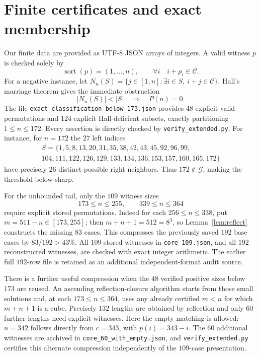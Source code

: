 \documentclass[10pt]{article}
\newcommand{\good}{\mathcal{G}}
\newcommand{\cubes}{\mathcal{C}}
\begin{document}
\section{Finite certificates and exact membership}
Our finite data are provided as UTF-8 JSON arrays of integers.
A valid witness $p$ is checked solely by
\[
\operatorname{sort}(p)=(1,\dots,n),\qquad
\forall i\quad i+p_i\in\cubes.
\]
For a negative instance, let
$N_n(S)=\{j\in[1,n]:\exists i\in S,\ i+j\in\cubes\}$.
Hall's marriage theorem gives the immediate obstruction
\begin{equation}\label{eq:hall}
|N_n(S)|<|S|\quad\Longrightarrow\quad P(n)=0.
\end{equation}
The file \texttt{exact\_classification\_below\_173.json}
provides $48$ explicit valid permutations and $124$
explicit Hall-deficient subsets, exactly partitioning
$1\le n\le172$. Every assertion is directly checked
by \texttt{verify\_extended.py}. For instance, for $n=172$
the $27$ left indices
\[
\begin{gathered}
S=\{1,5,8,13,20,31,35,38,42,43,45,92,96,99,\\
104,111,122,126,129,133,134,136,153,157,160,165,172\}
\end{gathered}
\]
have precisely $26$ distinct possible right neighbors.
Thus $172\notin\good$, making the threshold below sharp.

For the unbounded tail, only the $109$ witness sizes
\begin{equation}\label{eq:core}
173\le n\le255,\qquad 339\le n\le364
\end{equation}
require explicit stored permutations.
Indeed for each $256\le n\le338$, put
$m=511-n\in[173,255]$; then
$m+n+1=512=8^3$, so Lemma~\ref{lem:reflect}
constructs the missing $83$ cases.
This compresses the previously saved $192$ base cases
by $83/192>43\%$. All $109$ stored witnesses in
\texttt{core\_109.json}, and all $192$ reconstructed
witnesses, are checked with exact integer arithmetic.
The earlier full $192$-row file is retained as an
additional independent-format audit source.

There is a further useful compression when the $48$
verified positive sizes below $173$ are reused.
An ascending reflection-closure algorithm starts from
those small solutions and, at each $173\le n\le364$,
uses any already certified $m<n$ for which $m+n+1$
is a cube. Precisely $132$ lengths are obtained by
reflection and only $60$ further lengths need explicit
witnesses. Here the empty matching is allowed:
$n=342$ follows directly from $c=343$,
with $p(i)=343-i$. The $60$ additional
witnesses are archived in
\texttt{core\_60\_with\_empty.json}, and
\texttt{verify\_extended.py} certifies this alternate
compression independently of the $109$-case presentation.
\end{document}
